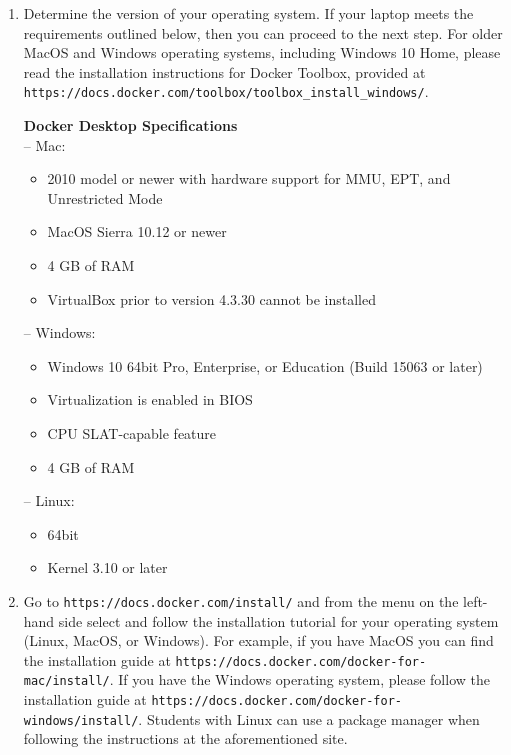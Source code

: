\documentclass[11pt]{article}
\newcommand{\url}[1]{\lstinline{#1}}
\begin{document}
\begin{enumerate}

    \item Determine the version of your operating system. If your laptop meets
      the requirements outlined below, then you can proceed to the next step.
      For older MacOS and Windows operating systems, including Windows 10 Home,
      please read the installation instructions for Docker Toolbox, provided at
      \url{https://docs.docker.com/toolbox/toolbox_install_windows/}.

      \textbf{Docker Desktop Specifications} \\
      -- Mac:
      \begin{itemize}
        \item 2010 model or newer with hardware support for MMU, EPT, and Unrestricted Mode
        \item MacOS Sierra 10.12 or newer
        \item 4 GB of RAM
        \item VirtualBox prior to version 4.3.30 cannot be installed
      \end{itemize}
      -- Windows:
      \begin{itemize}
        \item Windows 10 64bit Pro, Enterprise, or Education (Build 15063 or later)
        \item Virtualization is enabled in BIOS
        \item CPU SLAT-capable feature
        \item 4 GB of RAM
      \end{itemize}
      -- Linux:
      \begin{itemize}
        \item 64bit
        \item Kernel 3.10 or later
      \end{itemize}

    \item Go to \url{https://docs.docker.com/install/} and  from the menu on the
      left-hand side select and follow the installation tutorial for your
      operating system (Linux, MacOS, or Windows). For example, if you have
      MacOS you can find the installation guide at
      \url{https://docs.docker.com/docker-for-mac/install/}. If you have the
      Windows operating system, please follow the installation guide at
      \url{https://docs.docker.com/docker-for-windows/install/}. Students with
      Linux can use a package manager when following the instructions at the
      aforementioned site.


\end{enumerate}
\end{document}
